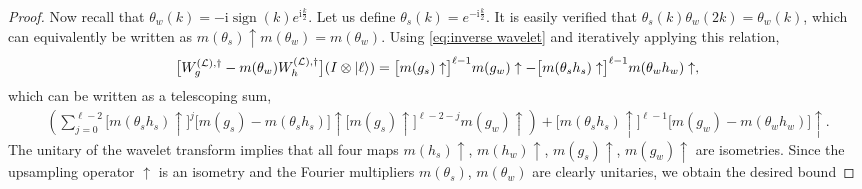 \documentclass[aps,pra,reprint,superscriptaddress,floatfix,amsmath,amssymb,amsfonts]{revtex4-1}
\DeclareMathOperator{\sign}{sign}
\newcommand*{\rmi}{\mathrm{i}}
\newcommand*{\ot}{\otimes}
\begin{document}
\begin{proof}
  Now recall that $\theta_w(k) = -\rmi\sign(k)e^{\rmi\frac k2}$.
  Let us define $\theta_s(k) = e^{-\rmi\frac k2}$.
  It is easily verified that $\theta_s(k) \theta_w(2k) = \theta_w(k)$,
  which can equivalently be written as $m(\theta_s) \uparrow m(\theta_w) = m(\theta_w)$.
  Using \cref{eq:inverse wavelet} and iteratively applying this relation,
  \begin{align*}
    \bigl[W_g^{(\mathcal L),\dagger} - m(\theta_w) W_h^{(\mathcal L),\dagger}\bigr] (I \ot \ket \ell)
  = \bigl[m(g_s) \uparrow\bigr]^{\ell-1} m(g_w) \uparrow - \bigl[m(\theta_s h_s) \uparrow\bigr]^{\ell-1} m(\theta_w h_w) \uparrow,
  \end{align*}
  which can be written as a telescoping sum,
  \begin{align*}
  \left( \sum_{j=0}^{\ell-2} \bigl[m(\theta_s h_s) \uparrow\bigr]^j \bigl[m(g_s) - m(\theta_s h_s)\bigr] \uparrow \bigl[m(g_s) \uparrow\bigr]^{\ell-2-j} m(g_w) \uparrow \right) + \bigl[m(\theta_s h_s) \uparrow\bigr]^{\ell-1} \bigl[m(g_w) - m(\theta_w h_w)\bigr] \uparrow.
  \end{align*}
  The unitary of the wavelet transform implies that all four maps $m(h_s) \uparrow$, $m(h_w) \uparrow$, $m(g_s) \uparrow$, $m(g_w) \uparrow$ are isometries.
  Since the upsampling operator $\uparrow$ is an isometry and the Fourier multipliers $m(\theta_s)$, $m(\theta_w)$ are clearly unitaries, we obtain the desired bound

\end{proof}
\end{document}

